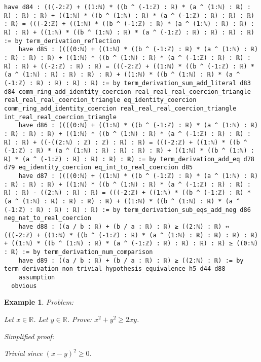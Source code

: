 \documentclass{article}
\newtheorem{example}{Example}
\begin{document}
\begin{tcolorbox}[colback=white!10, width=\linewidth]
\begin{lstlisting}[language=Lean4]
    have d84 : (((-2:ℤ) + ((1:ℕ) * ((b ^ (-1:ℤ) : ℝ) * (a ^ (1:ℕ) : ℝ) : ℝ) : ℝ) : ℝ) + ((1:ℕ) * ((b ^ (1:ℕ) : ℝ) * (a ^ (-1:ℤ) : ℝ) : ℝ) : ℝ) : ℝ) = (((-2:ℤ) + ((1:ℕ) * ((b ^ (-1:ℤ) : ℝ) * (a ^ (1:ℕ) : ℝ) : ℝ) : ℝ) : ℝ) + ((1:ℕ) * ((b ^ (1:ℕ) : ℝ) * (a ^ (-1:ℤ) : ℝ) : ℝ) : ℝ) : ℝ) := by term_derivation_reflection
    have d85 : ((((0:ℕ) + ((1:ℕ) * ((b ^ (-1:ℤ) : ℝ) * (a ^ (1:ℕ) : ℝ) : ℝ) : ℝ) : ℝ) + ((1:ℕ) * ((b ^ (1:ℕ) : ℝ) * (a ^ (-1:ℤ) : ℝ) : ℝ) : ℝ) : ℝ) + ((-2:ℤ) : ℝ) : ℝ) = (((-2:ℤ) + ((1:ℕ) * ((b ^ (-1:ℤ) : ℝ) * (a ^ (1:ℕ) : ℝ) : ℝ) : ℝ) : ℝ) + ((1:ℕ) * ((b ^ (1:ℕ) : ℝ) * (a ^ (-1:ℤ) : ℝ) : ℝ) : ℝ) : ℝ) := by term_derivation_sum_add_literal d83 d84 comm_ring_add_identity_coercion real_real_real_coercion_triangle real_real_real_coercion_triangle eq_identity_coercion comm_ring_add_identity_coercion real_real_real_coercion_triangle int_real_real_coercion_triangle
    have d86 : ((((0:ℕ) + ((1:ℕ) * ((b ^ (-1:ℤ) : ℝ) * (a ^ (1:ℕ) : ℝ) : ℝ) : ℝ) : ℝ) + ((1:ℕ) * ((b ^ (1:ℕ) : ℝ) * (a ^ (-1:ℤ) : ℝ) : ℝ) : ℝ) : ℝ) + ((-((2:ℕ) : ℤ) : ℤ) : ℝ) : ℝ) = (((-2:ℤ) + ((1:ℕ) * ((b ^ (-1:ℤ) : ℝ) * (a ^ (1:ℕ) : ℝ) : ℝ) : ℝ) : ℝ) + ((1:ℕ) * ((b ^ (1:ℕ) : ℝ) * (a ^ (-1:ℤ) : ℝ) : ℝ) : ℝ) : ℝ) := by term_derivation_add_eq d78 d79 eq_identity_coercion eq_int_to_real_coercion d85
    have d87 : ((((0:ℕ) + ((1:ℕ) * ((b ^ (-1:ℤ) : ℝ) * (a ^ (1:ℕ) : ℝ) : ℝ) : ℝ) : ℝ) + ((1:ℕ) * ((b ^ (1:ℕ) : ℝ) * (a ^ (-1:ℤ) : ℝ) : ℝ) : ℝ) : ℝ) - ((2:ℕ) : ℝ) : ℝ) = (((-2:ℤ) + ((1:ℕ) * ((b ^ (-1:ℤ) : ℝ) * (a ^ (1:ℕ) : ℝ) : ℝ) : ℝ) : ℝ) + ((1:ℕ) * ((b ^ (1:ℕ) : ℝ) * (a ^ (-1:ℤ) : ℝ) : ℝ) : ℝ) : ℝ) := by term_derivation_sub_eqs_add_neg d86 neg_nat_to_real_coercion
    have d88 : ((a / b : ℝ) + (b / a : ℝ) : ℝ) ≥ ((2:ℕ) : ℝ) ↔ (((-2:ℤ) + ((1:ℕ) * ((b ^ (-1:ℤ) : ℝ) * (a ^ (1:ℕ) : ℝ) : ℝ) : ℝ) : ℝ) + ((1:ℕ) * ((b ^ (1:ℕ) : ℝ) * (a ^ (-1:ℤ) : ℝ) : ℝ) : ℝ) : ℝ) ≥ ((0:ℕ) : ℝ) := by term_derivation_num_comparison
    have d89 : ((a / b : ℝ) + (b / a : ℝ) : ℝ) ≥ ((2:ℕ) : ℝ) := by term_derivation_non_trivial_hypothesis_equivalence h5 d44 d88
    assumption
  obvious

\end{lstlisting}
\end{tcolorbox}


\begin{example}
Problem:
\begin{tcolorbox}[colback=yellow!10, width=\linewidth]
Let $x\in\mathbb{R}$. Let $y\in\mathbb{R}$.
    Prove: $x^2 + y^2 \ge 2xy$.
\end{tcolorbox}

Simplified proof:
\begin{tcolorbox}[colback=blue!10, width=\linewidth]
Trivial since $(x-y)^2 \ge 0$.
\end{tcolorbox}
\end{example}
\end{document}
